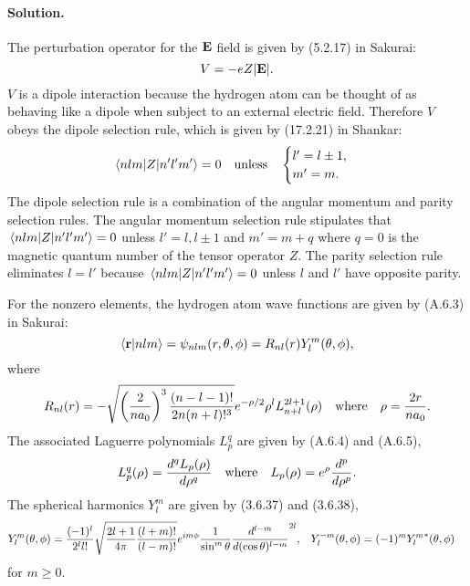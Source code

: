 \documentclass[11pt]{article}
\newcommand{\beq}{\begin{equation*}}
\newcommand{\eeq}{\end{equation*}}
\newcommand{\beqn}{\begin{equation}}
\newcommand{\eeqn}{\end{equation}}
\newenvironment{solution}
{
    \paragraph{Solution.}
    \ignorespaces
}
{
}
\begin{document}
\begin{solution}
	The perturbation operator for the $\mathbf{E}$ field is given by (5.2.17) in Sakurai:
	\beq
		V = -e Z |\vE|.
	\eeq
	$V$ is a dipole interaction because the hydrogen atom can be thought of as behaving like a dipole when subject to an external electric field.  Therefore $V$ obeys the dipole selection rule, which is given by (17.2.21) in Shankar:
	\beq
		\mel{n l m}{Z}{n' l' m'} = 0 \qq{unless} \begin{cases} l' = l \pm 1, \\ m' = m. \end{cases}
	\eeq
	The dipole selection rule is a combination of the angular momentum and parity selection rules.  The angular momentum selection rule stipulates that $\mel{n l m}{Z}{n' l' m'} = 0$ unless $l' = l, l \pm 1$ and $m' = m + q$ where $q = 0$ is the magnetic quantum number of the tensor operator $Z$.  The parity selection rule eliminates $l = l'$ because $\mel{n l m}{Z}{n' l' m'} = 0$ unless $l$ and $l'$ have opposite parity.
	
	For the nonzero elements, the hydrogen atom wave functions are given by (A.6.3) in Sakurai:
	\beq
		\braket{\vr}{n l m} = \psi_{n l m}(r, \tht, \phi) = R_{n l}(r) Y_l^m(\tht, \phi),
	\eeq
	where
	\beqn \label{R}
		R_{n l}(r) = -\sqrt{\left( \frac{2}{n \ao} \right)^3 \frac{(n - l - 1)!}{2n (n + l)!^3}} e^{-\rho / 2} \rho^l L_{n + l}^{2l + 1}(\rho)
		\qq{where}
		\rho = \frac{2 r}{n \ao}.
	\eeqn
	The associated Laguerre polynomials $L_p^q$ are given by (A.6.4) and (A.6.5),
	\beqn \label{laguerre}
		L_p^q(\rho) = \dv[q]{L_p(\rho)}{\rho}
		\qq{where}
		L_p(\rho) = e^\rho \dv[p]{}{\rho} (\rho^p e^{-\rho}).
	\eeqn
	The spherical harmonics $Y_l^m$ are given by (3.6.37) and (3.6.38),
	\begin{align} \label{harm}
		Y_l^m(\theta, \phi) &= \frac{(-1)^l}{2^l l!} \sqrt{\frac{2l + 1}{4\pi} \frac{(l + m)!}{(l - m)!}} e^{i m \phi} \frac{1}{\sin^m{\theta}} \dv[{l - m}]{}{(\cos\theta)} (\sin\theta)^{2l}, &
		Y_l^{-m}(\theta, \phi) &= (-1)^m {Y_l^m}^*(\theta, \phi)
	\end{align}
	for $m \geq 0$.
	

\end{solution}
\end{document}
